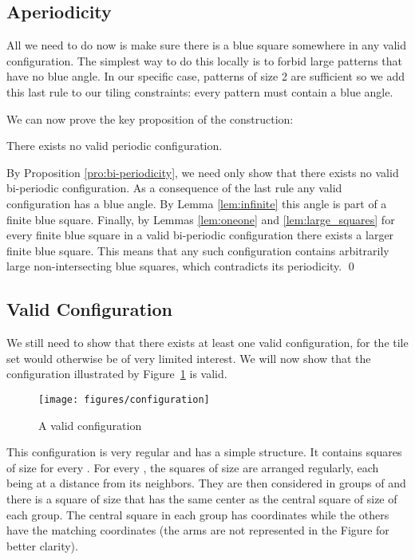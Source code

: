 \documentclass{jac}
\begin{document}
\subsection{Aperiodicity} \label{sub:aperiodicity}
All we need to do now is make sure there is a blue square somewhere in any valid configuration. The simplest way to do this locally is to forbid large patterns that have no blue angle. In our specific case, patterns of size 2 are sufficient so we add this last rule to our tiling constraints: every  pattern must contain a blue angle.

We can now prove the key proposition of the construction:
\begin{proposition}\label{pro:aperiodicity}
    There exists no valid periodic configuration.
\end{proposition}
\proof
By Proposition \ref{pro:bi-periodicity}, we need only show that there exists no valid bi-periodic configuration. As a consequence of the last rule any valid configuration has a blue angle. By Lemma \ref{lem:infinite} this angle is part of a finite blue square. Finally, by Lemmas \ref{lem:oneone} and \ref{lem:large_squares} for every finite blue square in a valid bi-periodic configuration there exists a larger finite blue square. This means that any such configuration contains arbitrarily large non-intersecting blue squares, which contradicts its periodicity.
\qed


\subsection{Valid Configuration} \label{sub:valid_configuration}
We still need to show that there exists at least one valid configuration, for the tile set would otherwise be of very limited interest. We will now show that the configuration illustrated by Figure~\ref{fig:configuration} is valid.

\begin{figure}[htbp]
	\centering
	\texttt{[image: figures/configuration]}
	\caption{A valid configuration}
	\label{fig:configuration}
\end{figure}

This configuration is very regular and has a simple structure. It contains squares of size  for every . For every , the squares of size  are arranged regularly, each being at a distance  from its neighbors. They are then considered in groups of  and there is a square of size  that has the same center as the central square of size  of each group. The central square in each  group has coordinates  while the others have the matching coordinates (the arms are not represented in the Figure for better clarity).
\end{document}
